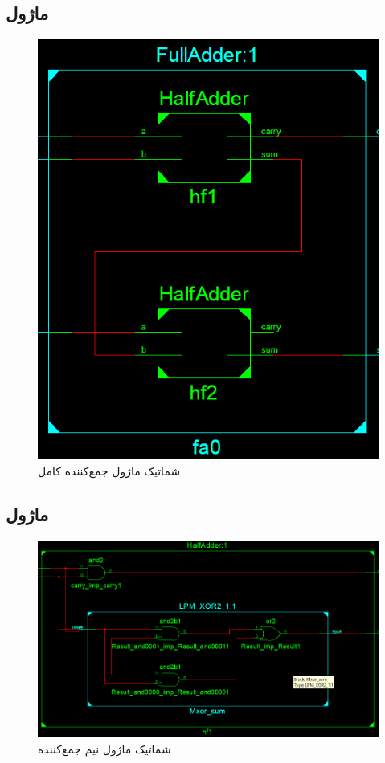 \documentclass[fleqn]{article}
\begin{document}
\subsection{ماژول }
\begin{figure}[H]
	\centering
	\includegraphics[width=.5\paperwidth]{./Schematic/FA.png}
	\caption{شماتیک ماژول جمع‌کننده کامل}
	\label{fa}
\end{figure}

\subsection{ماژول }
\begin{figure}[H]
	\centering
	\includegraphics[width=.5\paperwidth]{./Schematic/HA.png}
	\caption{شماتیک ماژول نیم جمع‌کننده}
	\label{hf}
\end{figure}
\end{document}
